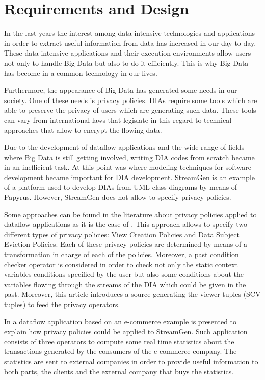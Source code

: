 \chapter[Chapter 3]{Requirements and Design}
\label{sec:chapter3}

In the last years the interest among data-intensive technologies and applications in order to extract useful information from data has increased in our day to day. These data-intensive applications and their execution environments allow users not only to handle Big Data but also to do it efficiently. This is why Big Data has become in a common technology in our lives.

Furthermore, the appearance of Big Data has generated some needs in our society. One of these needs is privacy policies. DIAs require some tools which are able to preserve the privacy of users which are generating such data. These tools can vary from international laws that legislate in this regard to technical approaches that allow to encrypt the flowing data.

Due to the development of dataflow applications and the wide range of fields where Big Data is still getting involved, writing DIA codes from scratch became in an inefficient task. At this point was where modeling techniques for software development became important for DIA development. StreamGen is an example of a platform used to develop DIAs from UML class diagrams by means of Papyrus. However, StreamGen does not allow to specify privacy policies.

Some approaches can be found in the literature about privacy policies applied to dataflow applications as it is the case of \cite{privacypoliciesarticle}. This approach allows to specify two different types of privacy policies: View Creation Policies and Data Subject Eviction Policies. Each of these privacy policies are determined by means of a transformation in charge of each of the policies. Moreover, a past condition checker operator is considered in order to check not only the static context variables conditions specified by the user but also some conditions about the variables flowing through the streams of the DIA which could be given in the past. Moreover, this article introduces a source generating the viewer tuples (SCV tuples) to feed the privacy operators.

In \cite{privacypoliciesarticle} a dataflow application based on an e-commerce example is presented to explain how privacy policies could be applied to StreamGen. Such application consists of three operators to compute some real time statistics about the transactions generated by the consumers of the e-commerce company. The statistics are sent to external companies in order to provide useful information to both parts, the clients and the external company that buys the statistics.

